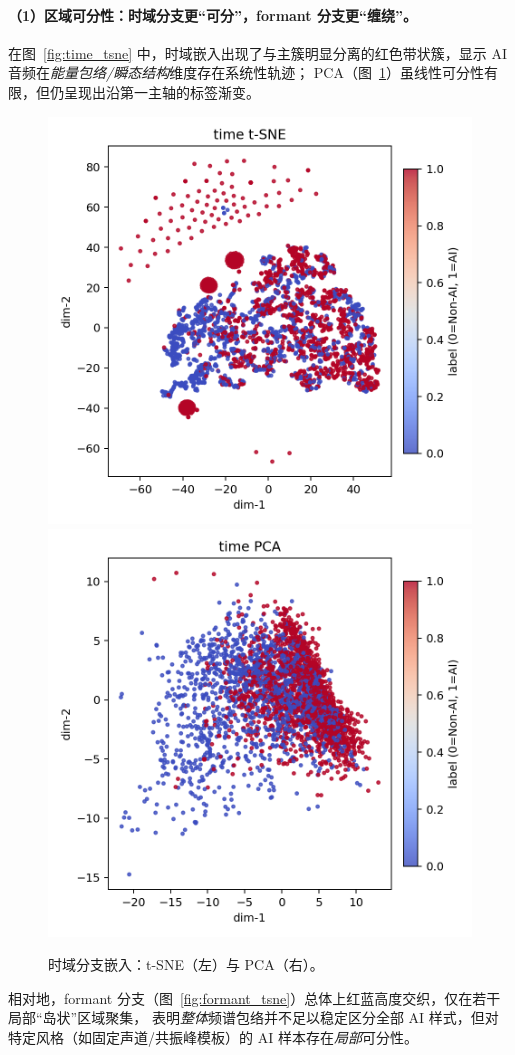 \documentclass[a4paper,12pt]{article}
\begin{document}
\paragraph{（1）区域可分性：时域分支更“可分”，formant 分支更“缠绕”。}
在图~\ref{fig:time_tsne} 中，时域嵌入出现了与主簇明显分离的红色带状簇，显示 AI 音频在\emph{能量包络/瞬态结构}维度存在系统性轨迹；
PCA（图~\ref{fig:time_pca}）虽线性可分性有限，但仍呈现出沿第一主轴的标签渐变。

\begin{figure}[H]
  \centering
  \includegraphics[width=.4\linewidth]{images_in_paper/embed_time_tsne.png}
  \includegraphics[width=.4\linewidth]{images_in_paper/embed_time_pca.png}
  \caption{时域分支嵌入：t-SNE（左）与 PCA（右）。}
  \label{fig:time_tsne}
  \label{fig:time_pca}
\end{figure}

相对地，formant 分支（图~\ref{fig:formant_tsne}）总体上红蓝高度交织，仅在若干局部“岛状”区域聚集，
表明\emph{整体}频谱包络并不足以稳定区分全部 AI 样式，但对特定风格（如固定声道/共振峰模板）的 AI 样本存在\emph{局部}可分性。
\end{document}
